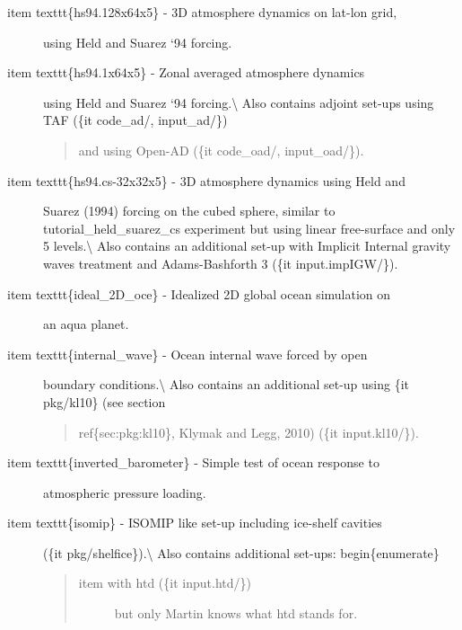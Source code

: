 \documentclass[letterpaper,10pt,english]{sphinxmanual}
\begin{document}
\begin{description}
\begin{description}
\end{description}

\item[{item texttt\{hs94.128x64x5\} - 3D atmosphere dynamics on lat-lon grid,}] \leavevmode
using Held and Suarez `94 forcing.

\item[{item texttt\{hs94.1x64x5\} - Zonal averaged atmosphere dynamics}] \leavevmode
using Held and Suarez `94 forcing.\textbackslash{}
Also contains adjoint set-ups using TAF (\{it code\_ad/, input\_ad/\})
\begin{quote}

and using Open-AD (\{it code\_oad/, input\_oad/\}).
\end{quote}

\item[{item texttt\{hs94.cs-32x32x5\} - 3D atmosphere dynamics using Held and}] \leavevmode
Suarez (1994) forcing on the cubed sphere, similar to tutorial\_held\_suarez\_cs
experiment but using linear free-surface and only 5 levels.\textbackslash{}
Also contains an additional set-up with Implicit Internal gravity waves
treatment and Adams-Bashforth 3 (\{it input.impIGW/\}).

\item[{item texttt\{ideal\_2D\_oce\} - Idealized 2D global ocean simulation on}] \leavevmode
an aqua planet.

\item[{item texttt\{internal\_wave\} - Ocean internal wave forced by open}] \leavevmode
boundary conditions.\textbackslash{}
Also contains an additional set-up using \{it pkg/kl10\} (see section
\begin{quote}

ref\{sec:pkg:kl10\}, Klymak and Legg, 2010) (\{it input.kl10/\}).
\end{quote}

\item[{item texttt\{inverted\_barometer\} - Simple test of ocean response to}] \leavevmode
atmospheric pressure loading.

\item[{item texttt\{isomip\} - ISOMIP like set-up including ice-shelf cavities}] \leavevmode
(\{it pkg/shelfice\}).\textbackslash{}
Also contains additional set-ups:
begin\{enumerate\}
\begin{quote}
\begin{description}
\item[{item with \sphinxquotedblleft{}htd\sphinxquotedblright{} (\{it input.htd/\})}] \leavevmode
but only Martin knows what \sphinxquotedblleft{}htd\sphinxquotedblright{} stands for.


\end{description}
\end{quote}
\end{description}
\end{document}
